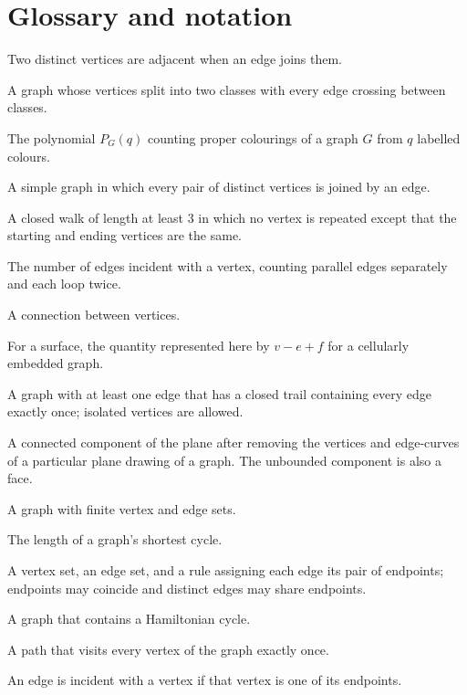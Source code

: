\chapter*{Glossary and notation}
\begin{description}[style=nextline]
\item[Adjacency] Two distinct vertices are adjacent when an edge joins them.
\item[Bipartite] A graph whose vertices split into two classes with every edge crossing between classes.
\item[Chromatic polynomial] The polynomial $P_G(q)$ counting proper colourings of a graph $G$ from $q$ labelled colours.
\item[Complete graph] A simple graph in which every pair of distinct vertices is joined by an edge.
\item[Cycle] A closed walk of length at least 3 in which no vertex is repeated except that the starting and ending vertices are the same.
\item[Degree] The number of edges incident with a vertex, counting parallel edges separately and each loop twice.
\item[Edge] A connection between vertices.
\item[Euler characteristic] For a surface, the quantity represented here by $v-e+f$ for a cellularly embedded graph.
\item[Eulerian graph] A graph with at least one edge that has a closed trail containing every edge exactly once; isolated vertices are allowed.
\item[Face] A connected component of the plane after removing the vertices and edge-curves of a particular plane drawing of a graph. The unbounded component is also a face.
\item[Finite graph] A graph with finite vertex and edge sets.
\item[Girth] The length of a graph's shortest cycle.
\item[Graph] A vertex set, an edge set, and a rule assigning each edge its pair of endpoints; endpoints may coincide and distinct edges may share endpoints.
\item[Hamiltonian graph] A graph that contains a Hamiltonian cycle.
\item[Hamiltonian path] A path that visits every vertex of the graph exactly once.
\item[Incident] An edge is incident with a vertex if that vertex is one of its endpoints.

\end{description}
